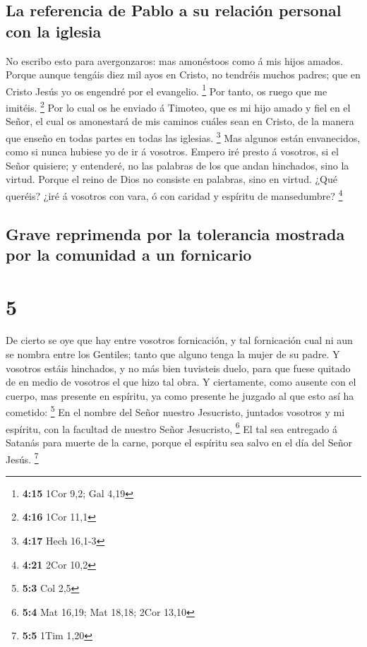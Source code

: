 \hypertarget{la-referencia-de-pablo-a-su-relaciuxf3n-personal-con-la-iglesia}{%
\subsection{La referencia de Pablo a su relación personal con la
iglesia}\label{la-referencia-de-pablo-a-su-relaciuxf3n-personal-con-la-iglesia}}

 No escribo esto para avergonzaros: mas amonéstoos como á
mis hijos amados.  Porque aunque tengáis diez mil ayos en
Cristo, no tendréis muchos padres; que en Cristo Jesús yo os engendré
por el evangelio. \footnote{\textbf{4:15} 1Cor 9,2; Gal 4,19}
 Por tanto, os ruego que me imitéis. \footnote{\textbf{4:16}
  1Cor 11,1}  Por lo cual os he enviado á Timoteo, que es
mi hijo amado y fiel en el Señor, el cual os amonestará de mis caminos
cuáles sean en Cristo, de la manera que enseño en todas partes en todas
las iglesias. \footnote{\textbf{4:17} Hech 16,1-3}  Mas
algunos están envanecidos, como si nunca hubiese yo de ir á vosotros.
 Empero iré presto á vosotros, si el Señor quisiere; y
entenderé, no las palabras de los que andan hinchados, sino la virtud.
 Porque el reino de Dios no consiste en palabras, sino en
virtud.  ¿Qué queréis? ¿iré á vosotros con vara, ó con
caridad y espíritu de mansedumbre? \footnote{\textbf{4:21} 2Cor 10,2}

\hypertarget{grave-reprimenda-por-la-tolerancia-mostrada-por-la-comunidad-a-un-fornicario}{%
\subsection{Grave reprimenda por la tolerancia mostrada por la comunidad
a un
fornicario}\label{grave-reprimenda-por-la-tolerancia-mostrada-por-la-comunidad-a-un-fornicario}}

\hypertarget{section-4}{%
\section{5}\label{section-4}}

 De cierto se oye que hay entre vosotros fornicación, y tal
fornicación cual ni aun se nombra entre los Gentiles; tanto que alguno
tenga la mujer de su padre.  Y vosotros estáis hinchados, y
no más bien tuvisteis duelo, para que fuese quitado de en medio de
vosotros el que hizo tal obra.  Y ciertamente, como ausente
con el cuerpo, mas presente en espíritu, ya como presente he juzgado al
que esto así ha cometido: \footnote{\textbf{5:3} Col 2,5} 
En el nombre del Señor nuestro Jesucristo, juntados vosotros y mi
espíritu, con la facultad de nuestro Señor Jesucristo, \footnote{\textbf{5:4}
  Mat 16,19; Mat 18,18; 2Cor 13,10}  El tal sea entregado á
Satanás para muerte de la carne, porque el espíritu sea salvo en el día
del Señor Jesús. \footnote{\textbf{5:5} 1Tim 1,20}

